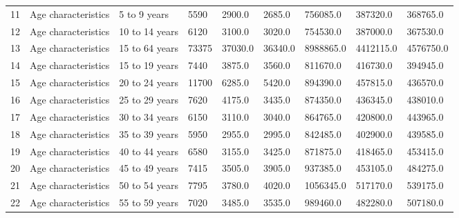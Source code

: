 \documentclass[10pt,a4paper]{report}
\begin{document}
\begin{table}[H]
\begin{adjustbox}{width=1\textwidth}
\begin{tabular}{@{}lllllllll@{}}
				11 & Age characteristics      & 5 to 9 years                                                                 & 5590   & 2900.0  & 2685.0  & 756085.0   & 387320.0  & 368765.0   \\
				12 & Age characteristics      & 10 to 14 years                                                               & 6120   & 3100.0  & 3020.0  & 754530.0   & 387000.0  & 367530.0   \\
				13 & Age characteristics      & 15 to 64 years                                                               & 73375  & 37030.0 & 36340.0 & 8988865.0  & 4412115.0 & 4576750.0  \\
				14 & Age characteristics      & 15 to 19 years                                                               & 7440   & 3875.0  & 3560.0  & 811670.0   & 416730.0  & 394945.0   \\
				15 & Age characteristics      & 20 to 24 years                                                               & 11700  & 6285.0  & 5420.0  & 894390.0   & 457815.0  & 436570.0   \\
				16 & Age characteristics      & 25 to 29 years                                                               & 7620   & 4175.0  & 3435.0  & 874350.0   & 436345.0  & 438010.0   \\
				17 & Age characteristics      & 30 to 34 years                                                               & 6150   & 3110.0  & 3040.0  & 864765.0   & 420800.0  & 443965.0   \\
				18 & Age characteristics      & 35 to 39 years                                                               & 5950   & 2955.0  & 2995.0  & 842485.0   & 402900.0  & 439585.0   \\
				19 & Age characteristics      & 40 to 44 years                                                               & 6580   & 3155.0  & 3425.0  & 871875.0   & 418465.0  & 453415.0   \\
				20 & Age characteristics      & 45 to 49 years                                                               & 7415   & 3505.0  & 3905.0  & 937385.0   & 453105.0  & 484275.0   \\
				21 & Age characteristics      & 50 to 54 years                                                               & 7795   & 3780.0  & 4020.0  & 1056345.0  & 517170.0  & 539175.0   \\
				22 & Age characteristics      & 55 to 59 years                                                               & 7020   & 3485.0  & 3535.0  & 989460.0   & 482280.0  & 507180.0   \\

\end{tabular}
\end{adjustbox}
\end{table}
\end{document}
